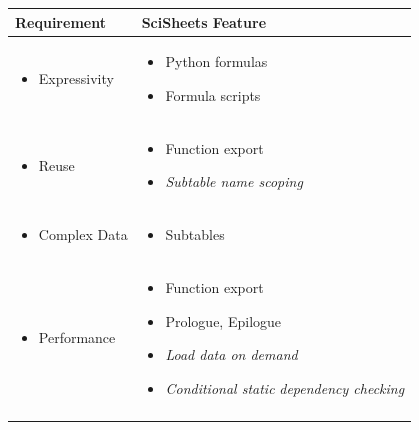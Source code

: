 \documentclass[letterpaper,compsoc,twoside]{IEEEtran}
\newlength{\DUtablewidth} %
\begin{document}
\begin{table}
\setlength{\DUtablewidth}{\tablewidth}
\begin{longtable*}[c]{p{0.331\DUtablewidth}p{0.389\DUtablewidth}}
\toprule
\textbf{%
Requirement} & \textbf{%
SciSheets Feature} \\
\midrule
\endfirsthead
%
\begin{itemize}

\item 
Expressivity
\end{itemize}
 & %
\begin{itemize}

\item 
Python formulas
\item 
Formula scripts
\end{itemize}
 \\
%
\begin{itemize}

\item 
Reuse
\end{itemize}
 & %
\begin{itemize}

\item 
Function export
\item 
\emph{Subtable name scoping}
\end{itemize}
 \\
%
\begin{itemize}

\item 
Complex Data
\end{itemize}
 & %
\begin{itemize}

\item 
Subtables
\end{itemize}
 \\
%
\begin{itemize}

\item 
Performance
\end{itemize}
 & %
\begin{itemize}

\item 
Function export
\item 
Prologue, Epilogue
\item 
\emph{Load data on demand}
\item 
\emph{Conditional static}
\emph{dependency checking}
\end{itemize}
 \\
%
\begin{itemize}


\end{itemize}
\end{longtable*}
\end{table}
\end{document}
